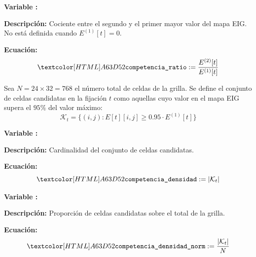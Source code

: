 \begin{featuredef}
\textbf{Variable \thetcbcounter:} 

\textbf{Descripción:} Cociente entre el segundo y el primer mayor valor
del mapa EIG. No está definida cuando $E^{(1)}[t] = 0$.

\textbf{Ecuación:}
\begin{equation}
    \feat{competencia\_ratio} := \frac{E^{(2)}[t]}{E^{(1)}[t]}
\end{equation}
\end{featuredef}

Sea $N = 24 \times 32 = 768$ el número total de celdas de la grilla.
Se define el conjunto de celdas candidatas en la fijación $t$ como
aquellas cuyo valor en el mapa EIG supera el $95\%$ del valor máximo:
\begin{equation}
    \mathcal{K}_t = \{(i,j) : E[t][i,j] \geq 0.95 \cdot E^{(1)}[t]\}
\end{equation}

\begin{featuredef}
\textbf{Variable \thetcbcounter:} 

\textbf{Descripción:} Cardinalidad del conjunto de celdas candidatas.

\textbf{Ecuación:}
\begin{equation}
    \feat{competencia\_densidad} := |\mathcal{K}_t|
\end{equation}
\end{featuredef}

\begin{featuredef}
\textbf{Variable \thetcbcounter:} 

\textbf{Descripción:} Proporción de celdas candidatas sobre el total
de la grilla.

\textbf{Ecuación:}
\begin{equation}
    \feat{competencia\_densidad\_norm} := \frac{|\mathcal{K}_t|}{N}
\end{equation}
\end{featuredef}

